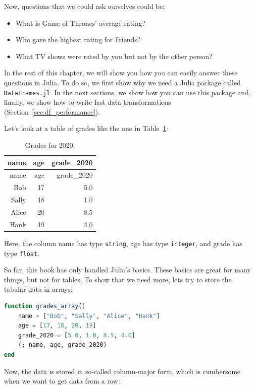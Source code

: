 \documentclass[
  notoc %
]{tufte-book}
\providecommand{\tightlist}{%
  \setlength{\itemsep}{0pt}\setlength{\parskip}{0pt}
}
\newcommand{\passthrough}[1]{#1}
\begin{document}
Now, questions that we could ask ourselves could be:

\begin{itemize}
\tightlist
\item
  What is Game of Thrones' average rating?
\item
  Who gave the highest rating for Friends?
\item
  What TV shows were rated by you but not by the other person?
\end{itemize}

In the rest of this chapter, we will show you how you can easily answer
these questions in Julia. To do so, we first show why we need a Julia
package called \passthrough{\lstinline!DataFrames.jl!}. In the next
sections, we show how you can use this package and, finally, we show how
to write fast data transformations (Section~\ref{sec:df_performance}).

Let's look at a table of grades like the one in
Table~\ref{tbl:grades_for_2020}:

\hypertarget{tbl:grades_for_2020}{}
\begin{longtable}[]{@{}rrr@{}}
\caption{\label{tbl:grades_for_2020}Grades for 2020.}\tabularnewline
\toprule
name & age & grade\_2020 \\
\midrule
\endfirsthead
\toprule
name & age & grade\_2020 \\
\midrule
\endhead
Bob & 17 & 5.0 \\
Sally & 18 & 1.0 \\
Alice & 20 & 8.5 \\
Hank & 19 & 4.0 \\
\bottomrule
\end{longtable}

Here, the column name has type \passthrough{\lstinline!string!}, age has
type \passthrough{\lstinline!integer!}, and grade has type
\passthrough{\lstinline!float!}.

So far, this book has only handled Julia's basics. These basics are
great for many things, but not for tables. To show that we need more,
lets try to store the tabular data in arrays:

\begin{lstlisting}[language=Julia]
function grades_array()
    name = ["Bob", "Sally", "Alice", "Hank"]
    age = [17, 18, 20, 19]
    grade_2020 = [5.0, 1.0, 8.5, 4.0]
    (; name, age, grade_2020)
end
\end{lstlisting}

Now, the data is stored in so-called column-major form, which is
cumbersome when we want to get data from a row:
\end{document}
